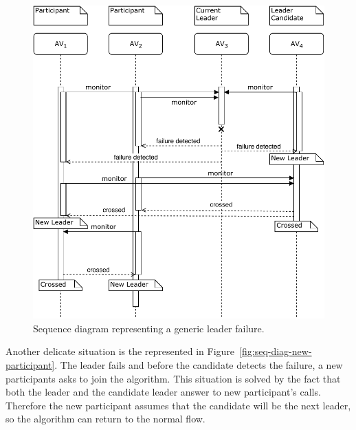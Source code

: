 \documentclass{memoir}
\begin{document}
\begin{figure}
	\centering
	\includegraphics[width=\linewidth]{sequence_diagrams/leader_sw_failure.pdf}
	\caption{Sequence diagram representing a generic leader failure.}
	\label{fig:seq-diag-leader-sw-failure}
\end{figure}


Another delicate situation is the represented in Figure~\ref{fig:seq-diag-new-participant}. The leader fails and before the candidate detects the failure, a new participants asks to join the algorithm. This situation is solved by the fact that both the leader and the candidate leader answer to new participant's calls. Therefore the new participant assumes that the candidate will be the next leader, so the algorithm can return to the normal flow.
\end{document}
